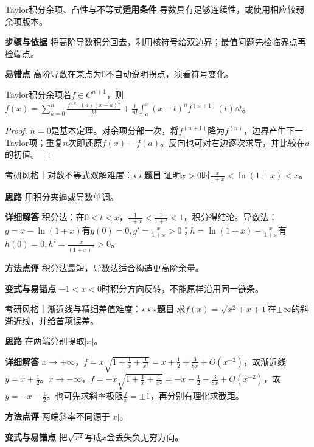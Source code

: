 \begin{method}{Taylor积分余项、凸性与不等式}\textbf{适用条件} 导数具有足够连续性，或使用相应较弱余项版本。\par\textbf{步骤与依据} 将高阶导数积分回去，利用核符号给双边界；最值问题先检临界点再检端点。\par\textbf{易错点} 高阶导数在某点为0不自动说明拐点，须看符号变化。\end{method}

\begin{theorem}{Taylor积分余项}若$f\in C^{n+1}$，则$f(x)=\sum_{k=0}^n\frac{f^{(k)}(a)(x-a)^k}{k!}+\frac1{n!}\int_a^x(x-t)^nf^{(n+1)}(t)\dd t$。\end{theorem}\begin{proof}$n=0$是基本定理。对余项分部一次，将$f^{(n+1)}$降为$f^{(n)}$，边界产生下一Taylor项；重复$n$次即还原$f(x)-f(a)$。反向也可对右边逐次求导，并比较在$a$的初值。\end{proof}

\begin{example}{考研风格｜对数不等式双解}{难度：$\star\star$}\label{deep:ex:differential_source_deep:logbound}\textbf{题目} 证明$x>0$时$\frac{x}{1+x}<\ln(1+x)<x$。\par\textbf{思路} 用积分夹逼或导数单调。\par\textbf{详细解答} 积分法：在$0<t<x$，$\frac{1}{1+x}<\frac{1}{1+t}<1$，积分得结论。导数法：$g=x-\ln(1+x)$有$g(0)=0,g'=\frac{x}{1+x}>0$；$h=\ln(1+x)-\frac{x}{1+x}$有$h(0)=0,h'=\frac{x}{(1+x)^2}>0$。\par\textbf{方法点评} 积分法最短，导数法适合构造更高阶余量。\par\textbf{变式与易错点} $-1<x<0$时积分方向反转，不能原样沿用同一链条。\end{example}

\begin{example}{考研风格｜渐近线与精细差值}{难度：$\star\star\star$}\label{deep:ex:differential_source_deep:asymptote}\textbf{题目} 求$f(x)=\sqrt{x^2+x+1}$在$\pm\infty$的斜渐近线，并给首项误差。\par\textbf{思路} 在两端分别提取$|x|$。\par\textbf{详细解答} $x\to+\infty$，$f=x\sqrt{1+\frac{1}{x}+\frac{1}{x^2}}=x+\frac{1}{2}+\frac{3}{8x}+O(x^{-2})$，故渐近线$y=x+\frac{1}{2}$。$x\to-\infty$，$f=-x\sqrt{1+\frac{1}{x}+\frac{1}{x^2}}=-x-\frac{1}{2}-\frac{3}{8x}+O(x^{-2})$，故$y=-x-\frac{1}{2}$。也可先求斜率极限$\frac{f}{x}=\pm1$，再分别有理化求截距。\par\textbf{方法点评} 两端斜率不同源于$|x|$。\par\textbf{变式与易错点} 把$\sqrt{x^2}$写成$x$会丢失负无穷方向。\end{example}
